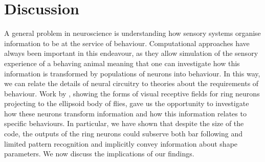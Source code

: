 \documentclass[10pt]{article}
\begin{document}
\section*{Discussion}
A general problem in neuroscience is understanding how sensory systems organise information to be at the service of behaviour. Computational approaches have always been important in this endeavour, as they allow simulation of the sensory experience of a behaving animal meaning that one can investigate how this information is transformed by populations of neurons into behaviour. In this way, we can relate the details of neural circuitry to theories about the requirements of behaviour. Work by \cite{Seelig2013}, showing the forms of visual receptive fields for ring neurons projecting to the ellipsoid body of flies, gave us the opportunity to investigate how these neurons transform information and how this information relates to specific behaviours. In particular, we have shown that despite the size of the code, the outputs of the ring neurons could subserve both bar following and limited pattern recognition and implicitly convey information about shape parameters. We now discuss the implications of our findings.
\end{document}
